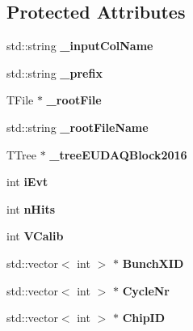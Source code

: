 \subsection*{Protected Attributes}
\begin{DoxyCompactItemize}
\item 
std\-::string {\bfseries \-\_\-input\-Col\-Name}\label{classCALICE_1_1RootTreeGeneratorEUDAQ2016_ac2e510fb22f7812c6daee89b12ac9c3b}

\item 
std\-::string {\bfseries \-\_\-prefix}\label{classCALICE_1_1RootTreeGeneratorEUDAQ2016_a322f00e45091686e6d9b9c8ead72dd4a}

\item 
T\-File $\ast$ {\bfseries \-\_\-root\-File}\label{classCALICE_1_1RootTreeGeneratorEUDAQ2016_a909e0073fa5d088d1c244d36268a31f0}

\item 
std\-::string {\bfseries \-\_\-root\-File\-Name}\label{classCALICE_1_1RootTreeGeneratorEUDAQ2016_a8bfc2d4f1ab531348913b77c6ac1ee12}

\item 
T\-Tree $\ast$ {\bfseries \-\_\-tree\-E\-U\-D\-A\-Q\-Block2016}\label{classCALICE_1_1RootTreeGeneratorEUDAQ2016_afa4dbf097c8ef24ba83e4a485d416d94}

\item 
int {\bfseries i\-Evt}\label{classCALICE_1_1RootTreeGeneratorEUDAQ2016_a07fada508d390fda146f131c66046efc}

\item 
int {\bfseries n\-Hits}\label{classCALICE_1_1RootTreeGeneratorEUDAQ2016_a29287f1fa8ec15486bd535499510fa26}

\item 
int {\bfseries V\-Calib}\label{classCALICE_1_1RootTreeGeneratorEUDAQ2016_ab37854f9741555e42f9b6a2dc4caad1e}

\item 
std\-::vector$<$ int $>$ $\ast$ {\bfseries Bunch\-X\-I\-D}\label{classCALICE_1_1RootTreeGeneratorEUDAQ2016_a07c009bbb352b95a0fa618e7fe39aaa5}

\item 
std\-::vector$<$ int $>$ $\ast$ {\bfseries Cycle\-Nr}\label{classCALICE_1_1RootTreeGeneratorEUDAQ2016_a5d00694a07f125233a8c4309d761a8f6}

\item 
std\-::vector$<$ int $>$ $\ast$ {\bfseries Chip\-I\-D}\label{classCALICE_1_1RootTreeGeneratorEUDAQ2016_a5462d4c744d42665604d3b2d5a1fedaf}


\end{DoxyCompactItemize}
